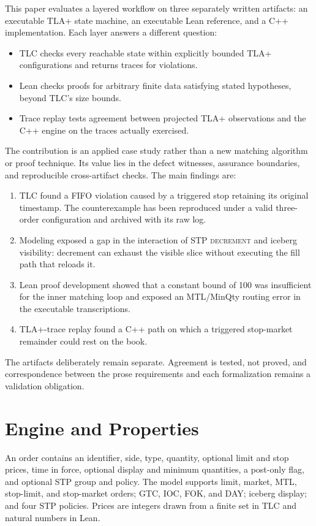\documentclass[runningheads]{llncs}
\begin{document}
This paper evaluates a layered workflow on three separately written
artifacts: an executable TLA+ state machine, an executable Lean reference,
and a C++ implementation. Each layer answers a different question:

\begin{itemize}
\item TLC checks every reachable state within explicitly bounded TLA+
configurations and returns traces for violations.
\item Lean checks proofs for arbitrary finite data satisfying stated
hypotheses, beyond TLC's size bounds.
\item Trace replay tests agreement between projected TLA+ observations and
the C++ engine on the traces actually exercised.
\end{itemize}

The contribution is an applied case study rather than a new matching
algorithm or proof technique. Its value lies in the defect witnesses,
assurance boundaries, and reproducible cross-artifact checks. The main
findings are:

\begin{enumerate}
\item TLC found a FIFO violation caused by a triggered stop retaining its
original timestamp. The counterexample has been reproduced under a valid
three-order configuration and archived with its raw log.
\item Modeling exposed a gap in the interaction of STP \textsc{decrement}
and iceberg visibility: decrement can exhaust the visible slice without
executing the fill path that reloads it.
\item Lean proof development showed that a constant bound of 100 was
insufficient for the inner matching loop and exposed an MTL/MinQty routing
error in the executable transcriptions.
\item TLA+-trace replay found a C++ path on which a triggered stop-market
remainder could rest on the book.
\end{enumerate}

The artifacts deliberately remain separate. Agreement is tested, not proved,
and correspondence between the prose requirements and each formalization
remains a validation obligation.

\section{Engine and Properties}

An order contains an identifier, side, type, quantity, optional limit and stop
prices, time in force, optional display and minimum quantities, a post-only
flag, and optional STP group and policy. The model supports limit, market,
MTL, stop-limit, and stop-market orders; GTC, IOC, FOK, and DAY; iceberg
display; and four STP policies. Prices are integers drawn from a finite set in
TLC and natural numbers in Lean.
\end{document}
